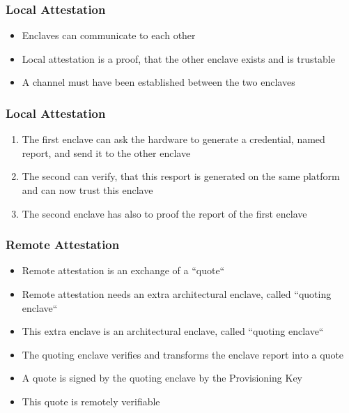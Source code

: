 \begin{frame}
    \frametitle{Local Attestation}
    \begin{itemize}[<+->]
        \item Enclaves can communicate to each other
        \item Local attestation is a proof, that the other enclave exists and is trustable
        \item A channel must have been established between the two enclaves
    \end{itemize}
\end{frame}

\begin{frame}
    \frametitle{Local Attestation}
    \begin{enumerate}[<+->]
        \item The first enclave can ask the hardware to generate a credential, named report, and send it to the other enclave
        \item The second can verify, that this resport is generated on the same platform and can now trust this enclave
        \item The second enclave has also to proof the report of the first enclave
    \end{enumerate}
\end{frame}


\begin{frame}
    \frametitle{Remote Attestation}
    \begin{itemize}[<+->]
        \item Remote attestation is an exchange of a ``quote``
        \item Remote attestation needs an extra architectural enclave, called ``quoting enclave``
        \item This extra enclave is an architectural enclave, called ``quoting enclave``
        \item The quoting enclave verifies and transforms the enclave report into a quote
        \item A quote is signed by the quoting enclave by the Provisioning Key
        \item This quote is remotely verifiable
    \end{itemize}
\end{frame}

